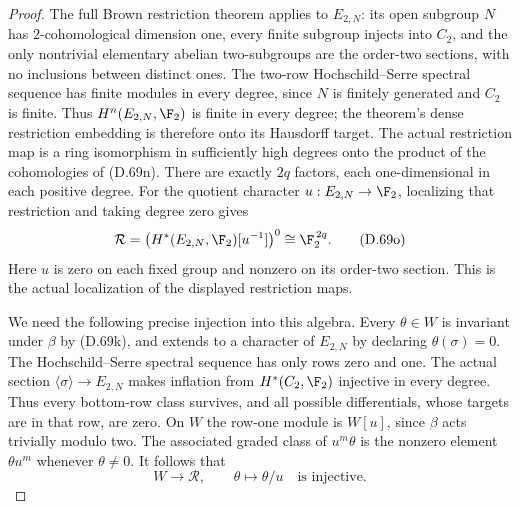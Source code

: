 \begin{proof}
The full Brown restriction theorem
\cite[Theorem~2 and \S1.1]{A-KochloukovaZalesskii2007}
applies to $E_{2,N}$: its open subgroup $N$ has
$2$-cohomological dimension one, every finite subgroup
injects into $C_2$, and the only nontrivial elementary
abelian two-subgroups are the order-two sections,
with no inclusions between distinct ones.
The two-row Hochschild--Serre spectral sequence
has finite modules in every degree, since $N$
is finitely generated and $C_2$ is finite.
Thus $H^n(E_{2,N},\F_2)$ is finite in every degree;
the theorem's dense restriction embedding is
therefore onto its Hausdorff target.
The actual restriction map is a ring isomorphism
in sufficiently high degrees onto the product of
the cohomologies of (D.69n).
There are exactly $2q$ factors, each one-dimensional
in each positive degree.
For the quotient character $u:E_{2,N}\to\F_2$,
localizing that restriction and taking degree zero gives
\[
 \mathcal R=
 \bigl(H^*(E_{2,N},\F_2)[u^{-1}]\bigr)^0
                         \cong\F_2^{\,2q}.                \tag{D.69o}
\]
Here $u$ is zero on each fixed group and nonzero
on its order-two section. This is the actual
localization of the displayed restriction maps.

We need the following precise injection into this algebra.
Every $\theta\in W$ is invariant under $\beta$ by
(D.69k), and extends to a character of $E_{2,N}$
by declaring $\theta(\sigma)=0$.
The Hochschild--Serre spectral sequence has only
rows zero and one. The actual section
$\langle\sigma\rangle\to E_{2,N}$ makes inflation
from $H^*(C_2,\F_2)$ injective in every degree.
Thus every bottom-row class survives, and all
possible differentials, whose targets are in that
row, are zero. On $W$ the row-one module is
$W[u]$, since $\beta$ acts trivially modulo two.
The associated graded class of $u^m\theta$ is the
nonzero element $\theta u^m$ whenever $\theta\ne0$.
It follows that
\[
                W\longrightarrow\mathcal R,\qquad
                         \theta\longmapsto\theta/u
                    \quad\text{is injective}.             \tag{D.69p}
\]


\end{proof}
